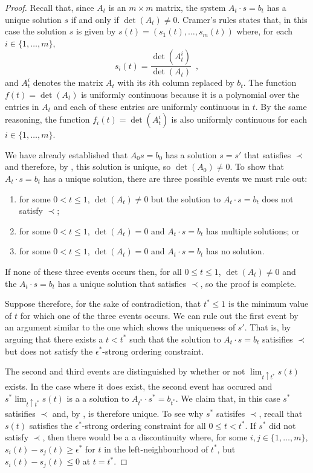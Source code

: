 \documentclass{patmorin}
\begin{document}
\begin{proof}
   Recall that, since $A_t$ is an $m\times m$ matrix, the system $A_t\cdot
   s=b_t$ has a unique solution $s$ if and only if $\det(A_t)\neq 0$.
   Cramer's rules states that, in this case the solution $s$ is given
   by $s(t)=(s_1(t),\ldots,s_m(t))$ where, for each $i\in\{1,\ldots,m\}$,
   \[ 
       s_i(t) = \frac{\det(A_t^i)}{\det(A_t)} \enspace ,
   \]
   and $A_t^i$ denotes the matrix $A_t$ with its $i$th column replaced
   by $b_t$. The function $f(t)=\det(A_t)$ is uniformly continuous
   because it is a polynomial over the entries in $A_t$ and each of
   these entries are uniformly continuous in $t$. By the same reasoning,
   the function $f_i(t)=\det(A_t^i)$ is also uniformly continuous for
   each $i\in\{1,\ldots,m\}$.

   We have already established that $A_0s=b_0$ has a solution $s=s'$
   that satisfies $\prec$ and therefore, by , this
   solution is unique, so $\det(A_0)\neq 0$.  To show that $A_t\cdot s=b_t$
   has a unique solution, there are three possible events we must rule out:
   \begin{enumerate}
     \item for some $0<t\le 1$, $\det(A_t)\neq 0$ but
           the solution to $A_t\cdot s=b_t$ does not satisfy $\prec$;
     \item for some $0<t\le 1$, $\det(A_t)=0$ and $A_t\cdot s=b_t$ has multiple 
           solutions; or
     \item for some $0<t\le 1$, $\det(A_t)=0$ and $A_t\cdot s=b_t$ has no solution.
   \end{enumerate}
   If none of these three events occurs then, for all $0\le t\le
   1$, $\det(A_t)\neq 0$ and the $A_t\cdot s=b_t$ has a unique solution that
   satisfies $\prec$, so the proof is complete.

   Suppose therefore, for the sake of contradiction, that $t^*\le 1$
   is the minimum value of $t$ for which one of the three events occurs.
   We can rule out the first event by an argument similar to the one which
   shows the uniqueness of $s'$.  That is, by arguing that there exists
   a $t<t^*$ such that the solution to $A_{t}\cdot s=b_{t}$ satisifies $\prec$
   but does not satisfy the $\epsilon^*$-strong ordering constraint.

   The second and third events are distinguished by whether or not
   $\lim_{t\uparrow t^*} s(t)$ exists.  In the case where it does
   exist, the second event has occured and $s^*\lim_{t\uparrow t^*}
   s(t)$ is a a solution to $A_{t^*}\cdot s^*=b_{t^*}$.  We claim that,
   in this case $s^*$ satisifies $\prec$ and, by ,
   is therefore unique.  To see why $s^*$ satisifes $\prec$, recall
   that $s(t)$ satisfies the $\epsilon^*$-strong ordering constraint
   for all $0\le t<t^*$.  If $s^*$ did not satisfy $\prec$, then there
   would be a a discontinuity where, for some $i,j\in\{1,\ldots,m\}$,
   $s_i(t)-s_j(t)\ge \epsilon^*$ for $t$ in the left-neighbourhood of
   $t^*$, but $s_i(t)-s_j(t) \le 0$ at $t=t^*$.



\end{proof}
\end{document}
